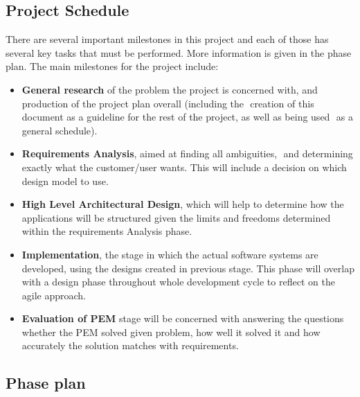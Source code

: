 \documentclass[12pt, a4paper]{report}   %
\begin{document}
\subsection{Project Schedule}
There are several important milestones in this project and each of those has several key tasks that must be performed. More information is given in the phase plan.
The main milestones for the project include:

\begin{itemize}
\item \textbf{General research} of the problem the project is concerned with, and production of the project plan overall (including the  creation of this document as a guideline for the rest of the project, as well as being used  as a general schedule). 



\item \textbf{Requirements Analysis}, aimed at finding all ambiguities,  and determining exactly what the customer/user wants. This will include a decision on which  design model to use.



\item \textbf{High Level Architectural Design}, which will help to determine how the applications will be structured given the limits and freedoms determined within the requirements Analysis phase.

\item \textbf{Implementation}, the stage in which the actual software systems are developed, using the designs created in previous stage. This phase will overlap with a design phase throughout whole development cycle to reflect on the agile approach.

\item \textbf{Evaluation of PEM} stage will be concerned with answering the questions whether the PEM solved given problem, how well it solved it and how accurately the solution matches with requirements. 
\end{itemize}


\subsection{Phase plan}
\end{document}
